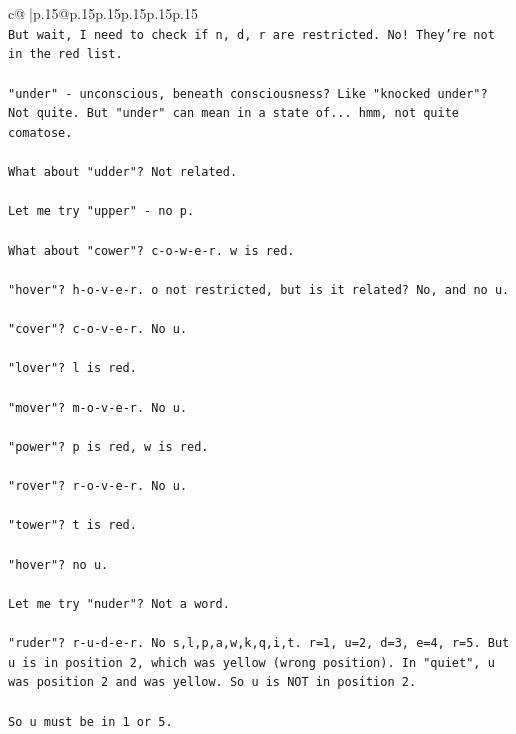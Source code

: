 \documentclass{article}
\begin{document}
{\begin{supertabular}{c@{$\;$}|p{.15\linewidth}@{}p{.15\linewidth}p{.15\linewidth}p{.15\linewidth}p{.15\linewidth}p{.15\linewidth}}
{{{\\ 
\texttt{But wait, I need to check if n, d, r are restricted. No! They're not in the red list.} \\
\\ 
\texttt{"under" {-} unconscious, beneath consciousness? Like "knocked under"? Not quite. But "under" can mean in a state of... hmm, not quite comatose.} \\
\\ 
\texttt{What about "udder"? Not related.} \\
\\ 
\texttt{Let me try "upper" {-} no p.} \\
\\ 
\texttt{What about "cower"? c{-}o{-}w{-}e{-}r. w is red.} \\
\\ 
\texttt{"hover"? h{-}o{-}v{-}e{-}r. o not restricted, but is it related? No, and no u.} \\
\\ 
\texttt{"cover"? c{-}o{-}v{-}e{-}r. No u.} \\
\\ 
\texttt{"lover"? l is red.} \\
\\ 
\texttt{"mover"? m{-}o{-}v{-}e{-}r. No u.} \\
\\ 
\texttt{"power"? p is red, w is red.} \\
\\ 
\texttt{"rover"? r{-}o{-}v{-}e{-}r. No u.} \\
\\ 
\texttt{"tower"? t is red.} \\
\\ 
\texttt{"hover"? no u.} \\
\\ 
\texttt{Let me try "nuder"? Not a word.} \\
\\ 
\texttt{"ruder"? r{-}u{-}d{-}e{-}r. No s,l,p,a,w,k,q,i,t. r=1, u=2, d=3, e=4, r=5. But u is in position 2, which was yellow (wrong position). In "quiet", u was position 2 and was yellow. So u is NOT in position 2. } \\
\\ 
\texttt{So u must be in 1 or 5.} \\
\\ 
}}}
\end{supertabular}}
\end{document}
